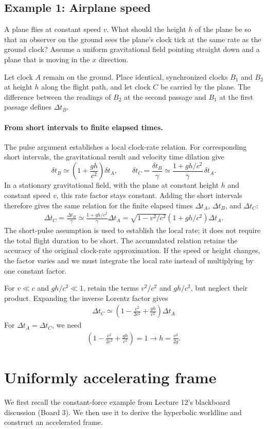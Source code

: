 \documentclass[12pt]{article}
\newcommand{\be}{\begin{eqnarray}}
\newcommand{\ee}{\end{eqnarray}}
\begin{document}
\subsection*{Example 1: Airplane speed}
A plane flies at constant speed $v$. What should the height $h$ of the plane be so that an observer on the ground sees the plane's clock tick at the same rate as the ground clock? Assume a uniform gravitational field pointing straight down and a plane that is moving in the $x$ direction. 

Let clock $A$ remain on the ground. Place identical, synchronized clocks $B_1$ and $B_2$ at height $h$ along the flight path, and let clock $C$ be carried by the plane. The difference between the readings of $B_2$ at the second passage and $B_1$ at the first passage defines $\Delta t_B$.

\paragraph{From short intervals to finite elapsed times.}
The pulse argument establishes a local clock-rate relation. For corresponding short intervals, the gravitational result and velocity time dilation give
\[
\delta t_B\simeq\left(1+\frac{gh}{c^2}\right)\delta t_A,
\qquad
\delta t_C=\frac{\delta t_B}{\gamma}
\simeq\frac{1+gh/c^2}{\gamma}\,\delta t_A.
\]
In a stationary gravitational field, with the plane at constant height $h$ and constant speed $v$, this rate factor stays constant. Adding the short intervals therefore gives the same relation for the finite elapsed times $\Delta t_A$, $\Delta t_B$, and $\Delta t_C$:
\be
\Delta t_C = \frac{\Delta t_B}{\gamma} \simeq \frac{1+gh/c^2}{\gamma} \Delta t_A = \sqrt{1-v^2/c^2}(1+gh/c^2) \Delta t_A.
\ee
The short-pulse assumption is used to establish the local rate; it does not require the total flight duration to be short. The accumulated relation retains the accuracy of the original clock-rate approximation. If the speed or height changes, the factor varies and we must integrate the local rate instead of multiplying by one constant factor.

For $v\ll c$ and $gh/c^2\ll1$, retain the terms $v^2/c^2$ and $gh/c^2$, but neglect their product. Expanding the inverse Lorentz factor gives
\be
\Delta t_C \simeq (1-\frac{v^2}{2c^2} + \frac{gh}{c^2}) \Delta t_A
\ee
For $\Delta t_A = \Delta t_C$, we need 
\be
(1-\frac{v^2}{2c^2} + \frac{gh}{c^2}) = 1\rightarrow h = \frac{v^2}{2g}.
\ee
\section{Uniformly accelerating frame}\label{sec:UAF}
We first recall the constant-force example from Lecture 12's blackboard discussion (Board 3). We then use it to derive the hyperbolic worldline and construct an accelerated frame.
\end{document}
